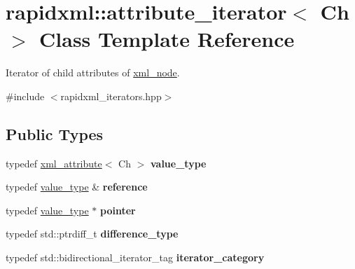 \hypertarget{classrapidxml_1_1attribute__iterator}{}\section{rapidxml\+:\+:attribute\+\_\+iterator$<$ Ch $>$ Class Template Reference}
\label{classrapidxml_1_1attribute__iterator}


Iterator of child attributes of \hyperlink{classrapidxml_1_1xml__node}{xml\+\_\+node}.  




{\ttfamily \#include $<$rapidxml\+\_\+iterators.\+hpp$>$}

\subsection*{Public Types}
\begin{DoxyCompactItemize}
\item 
\mbox{\label{classrapidxml_1_1attribute__iterator_ad4280d358828ad9c3eb1a787decb162e}} 
typedef \hyperlink{classrapidxml_1_1xml__attribute}{xml\+\_\+attribute}$<$ Ch $>$ {\bfseries value\+\_\+type}
\item 
\mbox{\label{classrapidxml_1_1attribute__iterator_a1d3a85a80293a8dc7f940d95f9bc6e13}} 
typedef \hyperlink{classrapidxml_1_1xml__attribute}{value\+\_\+type} \& {\bfseries reference}
\item 
\mbox{\label{classrapidxml_1_1attribute__iterator_a1b4d667fd5a317c63550195739c93480}} 
typedef \hyperlink{classrapidxml_1_1xml__attribute}{value\+\_\+type} $\ast$ {\bfseries pointer}
\item 
\mbox{\label{classrapidxml_1_1attribute__iterator_accfd6d8527d32b427496b42f71a2e37a}} 
typedef std\+::ptrdiff\+\_\+t {\bfseries difference\+\_\+type}
\item 
\mbox{\label{classrapidxml_1_1attribute__iterator_a97ac5d8b98f5b03c68cc566f5ac0a9e0}} 
typedef std\+::bidirectional\+\_\+iterator\+\_\+tag {\bfseries iterator\+\_\+category}
\end{DoxyCompactItemize}
